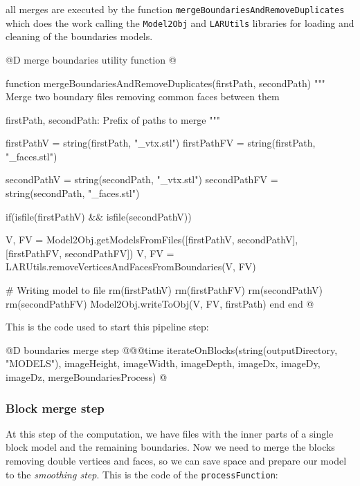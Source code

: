 \documentclass[11pt,oneside]{article}	%
\begin{document}
all merges are executed by the function \texttt{mergeBoundariesAndRemoveDuplicates} which does the work calling the \texttt{Model2Obj} and \texttt{LARUtils} libraries for loading and cleaning of the boundaries models.

@D merge boundaries utility function
@{function mergeBoundariesAndRemoveDuplicates(firstPath, secondPath)
  """
  Merge two boundary files removing common faces between
  them

  firstPath, secondPath: Prefix of paths to merge
  """

  firstPathV = string(firstPath, "_vtx.stl")
  firstPathFV = string(firstPath, "_faces.stl")

  secondPathV = string(secondPath, "_vtx.stl")
  secondPathFV = string(secondPath, "_faces.stl")

  if(isfile(firstPathV) && isfile(secondPathV))

    V, FV = Model2Obj.getModelsFromFiles([firstPathV, secondPathV],
					 [firstPathFV, secondPathFV])
    V, FV = LARUtils.removeVerticesAndFacesFromBoundaries(V, FV)

    # Writing model to file
    rm(firstPathV)
    rm(firstPathFV)
    rm(secondPathV)
    rm(secondPathFV)
    Model2Obj.writeToObj(V, FV, firstPath)
  end
end @}

This is the code used to start this pipeline step:

@D boundaries merge step
@{@@time iterateOnBlocks(string(outputDirectory, "MODELS"),
                  imageHeight, imageWidth, imageDepth,
                  imageDx, imageDy, imageDz,
                  mergeBoundariesProcess) @}
                
\subsubsection{Block merge step}\label{sec:blockMergeStep}

At this step of the computation, we have files with the inner parts of a single block model and the remaining boundaries. Now we need to merge the blocks removing double vertices and faces, so we can save space and prepare our model to the \textit{smoothing step}. This is the code of the \texttt{processFunction}:
\end{document}
